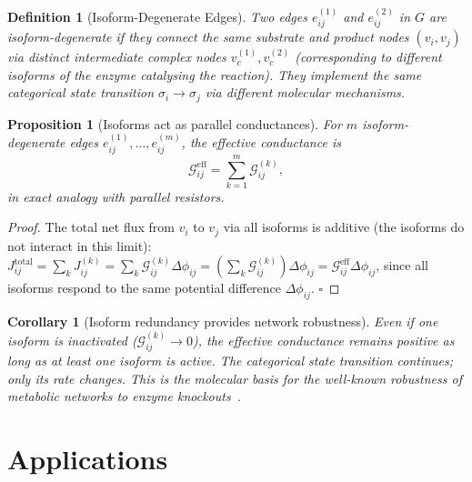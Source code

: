 \documentclass[twocolumn,10pt,a4paper]{article}
\newcommand{\Gcond}{\mathcal{G}}
\newtheorem{proposition}[theorem]{Proposition}
\newtheorem{corollary}[theorem]{Corollary}
\newtheorem{definition}[theorem]{Definition}
\begin{document}
\begin{definition}[Isoform-Degenerate Edges]
\label{def:isoforms}
Two edges $e_{ij}^{(1)}$ and $e_{ij}^{(2)}$ in $G$ are
\emph{isoform-degenerate} if they connect the same substrate and product nodes
$(v_i,v_j)$ via distinct intermediate complex nodes $v_c^{(1)},v_c^{(2)}$
(corresponding to different isoforms of the enzyme catalysing the reaction).
They implement the same categorical state transition $\sigma_i\to\sigma_j$
via different molecular mechanisms.
\end{definition}

\begin{proposition}[Isoforms act as parallel conductances]
\label{prop:isoforms}
For $m$ isoform-degenerate edges $e_{ij}^{(1)},\ldots,e_{ij}^{(m)}$, the
effective conductance is
\begin{equation}
  \Gcond_{ij}^{\mathrm{eff}} = \sum_{k=1}^m \Gcond_{ij}^{(k)},
  \label{eq:isoform-cond}
\end{equation}
in exact analogy with parallel resistors.
\end{proposition}

\begin{proof}
The total net flux from $v_i$ to $v_j$ via all isoforms is additive (the
isoforms do not interact in this limit):
$J_{ij}^{\mathrm{total}}=\sum_k J_{ij}^{(k)}=\sum_k\Gcond_{ij}^{(k)}\Delta\phi_{ij}
=(\sum_k\Gcond_{ij}^{(k)})\Delta\phi_{ij}=\Gcond_{ij}^{\mathrm{eff}}\Delta\phi_{ij}$,
since all isoforms respond to the same potential difference $\Delta\phi_{ij}$.
$\square$
\end{proof}

\begin{corollary}[Isoform redundancy provides network robustness]
\label{cor:isoform-robust}
Even if one isoform is inactivated ($\Gcond_{ij}^{(k)}\to 0$), the effective
conductance remains positive as long as at least one isoform is active.  The
categorical state transition continues; only its rate changes.  This is the
molecular basis for the well-known robustness of metabolic networks to enzyme
knockouts~\cite{BarabasiOltvai2004,Alon2007book}.
\end{corollary}

\section{Applications}
\label{sec:applications}
\end{document}
